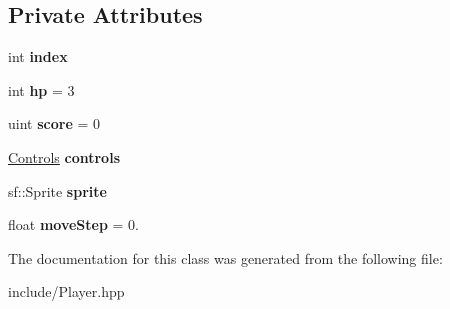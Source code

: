 \subsection*{Private Attributes}
\begin{DoxyCompactItemize}
\item 
\mbox{\label{class_player_a1d1f9fee5f774351292af1d0cfa7d65c}} 
int {\bfseries index}
\item 
\mbox{\label{class_player_a2baad6b9a274417a7374baf11d5f723d}} 
int {\bfseries hp} = 3
\item 
\mbox{\label{class_player_ab8b3c0ffbde70b09f2ad4d230478f33b}} 
uint {\bfseries score} = 0
\item 
\mbox{\label{class_player_a13625a09fdc72185e82ff5f6894049af}} 
\mbox{\hyperlink{struct_controls}{Controls}} {\bfseries controls}
\item 
\mbox{\label{class_player_a19bc8731e5e84613a2ae7c4b5134dfab}} 
sf\+::\+Sprite {\bfseries sprite}
\item 
\mbox{\label{class_player_aca3b0c23e14b372078c31cdb7906032c}} 
float {\bfseries move\+Step} = 0.
\end{DoxyCompactItemize}


The documentation for this class was generated from the following file\+:\begin{DoxyCompactItemize}
\item 
include/Player.\+hpp\end{DoxyCompactItemize}
